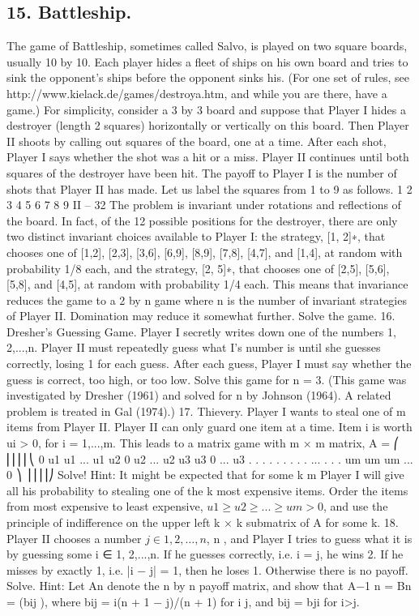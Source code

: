 \documentclass[]{report}
\begin{document}
\subsection{15. Battleship.}
The game of Battleship, sometimes called Salvo, is played on two
square boards, usually 10 by 10. Each player hides a fleet of ships on his own board and
tries to sink the opponent’s ships before the opponent sinks his. (For one set of rules, see
http://www.kielack.de/games/destroya.htm, and while you are there, have a game.)
For simplicity, consider a 3 by 3 board and suppose that Player I hides a destroyer
(length 2 squares) horizontally or vertically on this board. Then Player II shoots by calling
out squares of the board, one at a time. After each shot, Player I says whether the shot
was a hit or a miss. Player II continues until both squares of the destroyer have been hit.
The payoff to Player I is the number of shots that Player II has made. Let us label the
squares from 1 to 9 as follows.
1 2 3
4 5 6
7 8 9
II – 32
The problem is invariant under rotations and reflections of the board. In fact, of
the 12 possible positions for the destroyer, there are only two distinct invariant choices
available to Player I: the strategy, [1, 2]∗, that chooses one of [1,2], [2,3], [3,6], [6,9], [8,9],
[7,8], [4,7], and [1,4], at random with probability 1/8 each, and the strategy, [2, 5]∗, that
chooses one of [2,5], [5,6], [5,8], and [4,5], at random with probability 1/4 each. This means
that invariance reduces the game to a 2 by n game where n is the number of invariant
strategies of Player II. Domination may reduce it somewhat further. Solve the game.
16. Dresher’s Guessing Game. Player I secretly writes down one of the numbers
1, 2,...,n. Player II must repeatedly guess what I’s number is until she guesses correctly,
losing 1 for each guess. After each guess, Player I must say whether the guess is correct,
too high, or too low. Solve this game for n = 3. (This game was investigated by Dresher
(1961) and solved for n  by Johnson (1964). A related problem is treated in Gal
(1974).)
17. Thievery. Player I wants to steal one of m  items from Player II. Player II
can only guard one item at a time. Item i is worth ui > 0, for i = 1,...,m. This leads to
a matrix game with m × m matrix,
A =
⎛
⎜⎜⎜⎜⎝
0 u1 u1 ... u1
u2 0 u2 ... u2
u3 u3 0 ... u3
.
.
. .
.
. .
.
. ... .
.
.
um um um ... 0
⎞
⎟⎟⎟⎟⎠
Solve!
Hint: It might be expected that for some k \leq m Player I will give all his probability
to stealing one of the k most expensive items. Order the items from most expensive to
least expensive, $u1 \geq u2 \geq ... \geq um > 0$, and use the principle of indifference on the upper
left k × k submatrix of A for some k.
18. Player II chooses a number $j \in {1, 2,\ldots,n}$, n , and Player I tries to guess
what it is by guessing some i ∈ {1, 2,...,n}. If he guesses correctly, i.e. i = j, he wins 2.
If he misses by exactly 1, i.e. |i − j| = 1, then he loses 1. Otherwise there is no payoff.
Solve. Hint: Let An denote the n by n payoff matrix, and show that A−1 n = Bn = (bij ),
where bij = i(n + 1 − j)/(n + 1) for i \leq j, and bij = bji for i>j.
\end{document}
